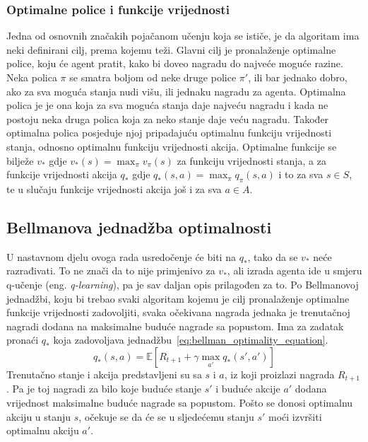 \subsubsection{Optimalne police i funkcije vrijednosti}
Jedna od osnovnih značakih pojačanom učenju koja se ističe, je da algoritam ima neki definirani cilj, prema kojemu teži. Glavni cilj je pronalaženje optimalne police, koju će agent pratit, kako bi doveo nagradu do najveće moguće razine. Neka polica $\pi$ se smatra boljom od neke druge police $\pi'$, ili bar jednako dobro, ako za sva moguća stanja nudi višu, ili jednaku nagradu za agenta. Optimalna polica je je ona koja za sva moguća stanja daje najveću nagradu i kada ne postoju neka druga polica koja za neko stanje daje veću nagradu. Također optimalna polica posjeduje njoj pripadajuću optimalnu funkciju vrijednosti stanja, odnosno optimalnu funkciju vrijednosti akcija. Optimalne funkcije se bilježe $v_*$ gdje $v_*(s) = \max_\pi v_\pi(s)$ za funkciju vrijednosti stanja, a za funkcije vrijednosti akcija $q_*$ gdje $q_*(s, a) = \max_\pi q_\pi(s, a)$ i to za sva $s \in S$, te u slučaju funkcije vrijednosti akcija još i za sva $a \in A$.

\subsection{Bellmanova jednadžba optimalnosti}
U nastavnom djelu ovoga rada usredočenje će biti na $q_*$, tako da se $v_*$ neće razrađivati. To ne znači da to nije primjenivo za $v_*$, ali izrada agenta ide u smjeru q-učenje (eng. \textit{q-learning}), pa je sav daljan opis prilagođen za to. 
Po Bellmanovoj jednadžbi, koju bi trebao svaki algoritam kojemu je cilj pronalaženje optimalne funkcije vrijednosti zadovoljiti, svaka očekivana nagrada jednaka je trenutačnoj nagradi dodana na maksimalne buduće nagrade sa popustom. Ima za zadatak pronaći $q_*$ koja zadovoljava jednadžbu~\ref{eq:bellman_optimality_equation}.
\begin{equation}\label{eq:bellman_optimality_equation}
q_*(s, a) = \mathbb{E}\left[R_{t+1} + \gamma\max_{a'}q_*(s', a')\right]
\end{equation}
Trenutačno stanje i akcija predstavljeni su sa $s$ i $a$, iz koji proizlazi nagrada $R_{t+1}$. Pa je toj nagradi za bilo koje buduće stanje $s'$ i buduće akcije $a'$ dodana vrijednost maksimalne buduće nagrade sa popustom. Pošto se donosi optimalnu akciju u stanju $s$, očekuje se da će se u sljedećemu stanju $s'$ moći izvršiti optimalnu akciju $a'$.

